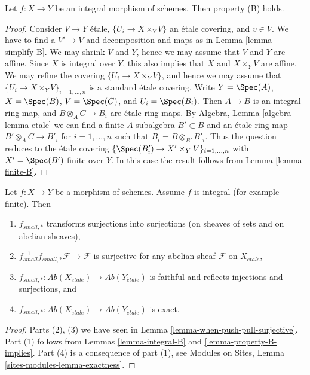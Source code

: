 \begin{lemma}
\label{lemma-integral-B}
Let $f : X \to Y$ be an integral morphism of schemes.
Then property (B) holds.
\end{lemma}

\begin{proof}
Consider $V \to Y$ \'etale, $\{U_i \to X \times_Y V\}$ an \'etale covering, and
$v \in V$. We have to find a $V' \to V$ and decomposition and maps as in
Lemma \ref{lemma-simplify-B}.
We may shrink $V$ and $Y$, hence we may assume that $V$ and $Y$ are affine.
Since $X$ is integral over $Y$, this also implies that $X$ and
$X \times_Y V$ are affine. We may refine the covering
$\{U_i \to X \times_Y V\}$, and hence we may assume that
$\{U_i \to X \times_Y V\}_{i = 1, \ldots, n}$ is a standard \'etale covering.
Write $Y = \Spec(A)$, $X = \Spec(B)$,
$V = \Spec(C)$, and $U_i = \Spec(B_i)$.
Then $A \to B$ is an integral ring map, and $B \otimes_A C \to B_i$ are
\'etale ring maps. By
Algebra, Lemma \ref{algebra-lemma-etale}
we can find a finite $A$-subalgebra $B' \subset B$ and an \'etale ring
map $B' \otimes_A C \to B'_i$ for $i = 1, \ldots, n$
such that $B_i = B \otimes_{B'} B'_i$. Thus the question
reduces to the \'etale covering
$\{\Spec(B'_i) \to X' \times_Y V\}_{i = 1, \ldots, n}$
with $X' = \Spec(B')$ finite over $Y$.
In this case the result follows from
Lemma \ref{lemma-finite-B}.
\end{proof}

\begin{lemma}
\label{lemma-what-integral}
Let $f : X \to Y$ be a morphism of schemes.
Assume $f$ is integral (for example finite).
Then
\begin{enumerate}
\item $f_{small, *}$ transforms surjections into surjections (on sheaves
of sets and on abelian sheaves),
\item $f_{small}^{-1}f_{small, *}\mathcal{F} \to \mathcal{F}$
is surjective for any abelian sheaf $\mathcal{F}$ on $X_{\acute{e}tale}$,
\item
$f_{small, *} :
\textit{Ab}(X_{\acute{e}tale})
\to
\textit{Ab}(Y_{\acute{e}tale})$
is faithful and reflects injections and surjections, and
\item
$f_{small, *} :
\textit{Ab}(X_{\acute{e}tale})
\to
\textit{Ab}(Y_{\acute{e}tale})$
is exact.
\end{enumerate}
\end{lemma}

\begin{proof}
Parts (2), (3) we have seen in
Lemma \ref{lemma-when-push-pull-surjective}.
Part (1) follows from
Lemmas \ref{lemma-integral-B} and \ref{lemma-property-B-implies}.
Part (4) is a consequence of part (1), see
Modules on Sites, Lemma \ref{sites-modules-lemma-exactness}.
\end{proof}








